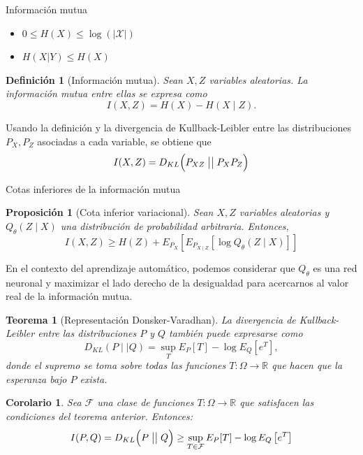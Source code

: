 \documentclass[aspectratio=169]{beamer}
\newcommand\KL[2]{D_{KL}\Big(#1 \bigm|\bigm| #2\Big)}
\newcommand{\X}{\mathcal{X}}
\newcommand{\R}{\mathbb{R}}
\newtheorem{defi}{Definición}
\newtheorem{prop}{Proposición}
\newtheorem{nth}{Teorema}
\newtheorem{cor}{Corolario}
\begin{document}
  \begin{frame}{Información mutua}
    
    \begin{itemize}
      \item $0 \leq H(X) \leq \log(|\X|)$
      \item $ H(X|Y) \leq H(X) $
     \end{itemize}

     
    \begin{defi}[Información mutua]
      Sean \(X,Z\) variables aleatorias. La \emph{información mutua} entre ellas se expresa como
      \[
      I(X,Z) = H(X) - H(X\mid Z).
      \]
    \end{defi}
    Usando la definición y la divergencia de Kullback-Leibler entre las distribuciones \(P_X,P_Z\) asociadas a cada variable, se obtiene que
    \[
    I(X,Z) =  \KL{P_{XZ}}{P_X P_Z}
    \]
 
  \end{frame}
  \begin{frame}{Cotas inferiores de la información mutua}
  \begin{prop}[Cota inferior variacional]
  Sean \(X,Z\) variables aleatorias y \(Q_\theta (Z\mid X)\) una distribución de probabilidad arbitraria. Entonces,
  \[
  I(X,Z) \geq H(Z) + E_{P_X} \left[ E_{P_{X \mid Z}} \left[ \log Q_\theta(Z \mid X) \right]\right]
  \]
  \end{prop}

  En el contexto del aprendizaje automático, podemos considerar que \(Q_\theta\) es una red neuronal y maximizar el lado derecho de la desigualdad para acercarnos al valor real de la información mutua.
  

\end{frame}

\begin{frame}
  
  
  \begin{nth}[Representación Donsker-Varadhan]
  La divergencia de Kullback-Leibler entre las distribuciones \(P\) y \(Q\) también puede expresarse como
  \[
  D_{KL}(P \mid \mid Q) = \sup_{T} E_P[T] - \log E_Q\left[e^T\right],
  \]
  donde el supremo se toma sobre todas las funciones \(T: \Omega \to \R \) que hacen que la esperanza bajo \( P \) exista.
  \end{nth}
  
  \begin{cor}
  Sea \(\mathcal F\) una clase de funciones \( T : \Omega \to \R \) que satisfacen las condiciones del teorema anterior. Entonces:
  \[
  I(P,Q) = \KL{P}{Q}  \geq \sup_{T \in \mathcal F} E_P[T] - \log E_Q\left[e^T\right]
  \]
  \end{cor}
  \end{frame}
\end{document}
